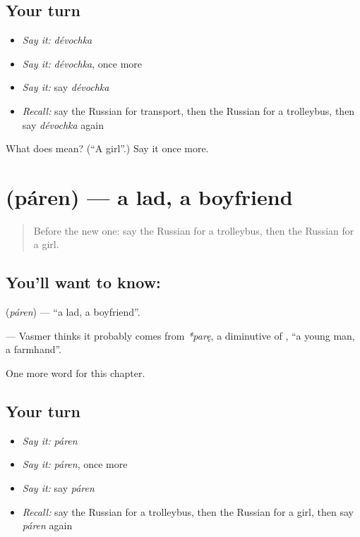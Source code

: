 \subsection*{Your turn}
\begin{itemize}
\raggedright
  \item \emph{Say it:} \emph{dévochka}
  \item \emph{Say it:} \emph{dévochka}, once more
  \item \emph{Say it:} say \emph{dévochka}
  \item \emph{Recall:} say the Russian for transport, then the Russian for a trolleybus, then say \emph{dévochka} again
\end{itemize}

\begin{tcolorbox}[breakable,colback=teal!4,colframe=teal!35!black,title={Before you move on}]
What does  mean? (\textquotedblleft{}A girl\textquotedblright{}.) Say it once more.
\end{tcolorbox}
\section[\texorpdfstring{\ru{парень} (páren)}{парень (páren)}]{ (páren) — a lad, a boyfriend}

\label{lesson:RU-C254-paren}



\begin{quote}
Before the new one: say the Russian for a trolleybus, then the Russian for a girl.
\end{quote}

\subsection*{You'll want to know: }
\textbf{} (\emph{páren}) — \textquotedblleft{}a lad, a boyfriend\textquotedblright{}.

\begin{cousinweb}
\textbf{} — Vasmer thinks it probably comes from \emph{*parę}, a diminutive of \emph{}, \textquotedblleft{}a young man, a farmhand\textquotedblright{}.
\end{cousinweb}

\begin{grammarlens}[title={What you've built}]
One more word for this chapter.
\end{grammarlens}

\subsection*{Your turn}
\begin{itemize}
\raggedright
  \item \emph{Say it:} \emph{páren}
  \item \emph{Say it:} \emph{páren}, once more
  \item \emph{Say it:} say \emph{páren}
  \item \emph{Recall:} say the Russian for a trolleybus, then the Russian for a girl, then say \emph{páren} again
\end{itemize}

